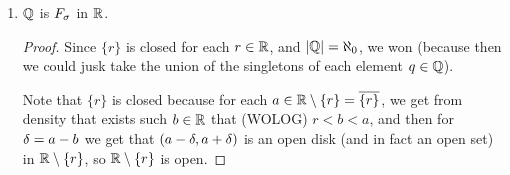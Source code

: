 \documentclass[a4paper]{article}
\begin{document}
\begin{enumerate}
\begin{proof}
			The general case can be deduce by taking apart $A$ to be a finite union of simple closed subsets (whom complement is an open disk) which is doable since the closed disks form a base for the family of closed sets in a metric space. 
		\end{proof}
		\item $\mathbb{Q}$ is $F_\sigma$ in $\mathbb{R}$. \begin{proof}
			Since $\{r\}$ is closed for each $r \in \mathbb{R}$, and $\left \lvert \mathbb{Q} \right \rvert = \aleph_0$, we won (because then we could jusk take the union of the singletons of each element $q \in \mathbb{Q}$). 
			
			Note that $\{r\}$ is closed because for each $a \in \mathbb{R}\setminus \{r\} = \overline{\{r\}}$, we get from density that exists such $b \in \mathbb{R}$ that (WOLOG) $r < b < a$, and then for $\delta = a - b$ we get that $(a - \delta, a + \delta)$ is an open disk (and in fact an open set) in $\mathbb{R} \setminus \{r\}$, so $\mathbb{R}\setminus \{r\}$ is open. 
		\end{proof}
	\end{enumerate}
	
\end{document}

